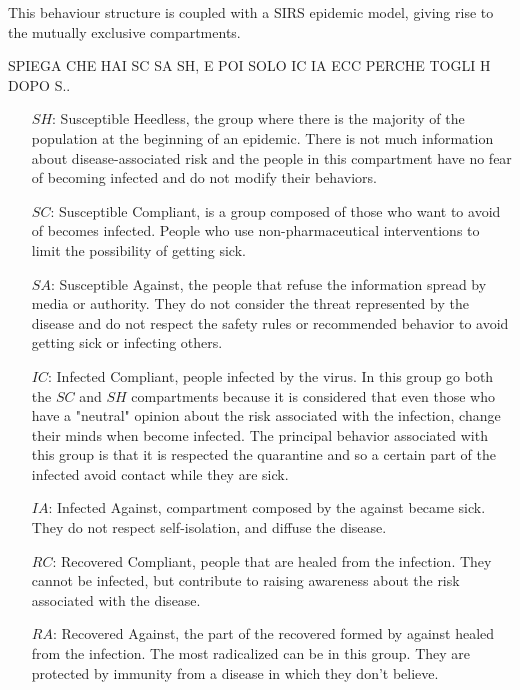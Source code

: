 This behaviour structure is coupled with a SIRS epidemic model, giving rise to the mutually exclusive compartments.

SPIEGA CHE HAI SC SA SH, E POI SOLO IC IA ECC
PERCHE TOGLI H DOPO S..

\begin{itemize}
	\item[$SH$:] Susceptible Heedless, the group where there is the majority of the population at the beginning of an epidemic. There is not much information about disease-associated risk and the people in this compartment have no fear of becoming infected and do not modify their behaviors.
	\item[$SC$:] Susceptible Compliant, is a group composed of those who want to avoid of becomes infected. People who use non-pharmaceutical interventions to limit the possibility of getting sick.
	\item[$SA$:] Susceptible Against, the people that refuse the information spread by media or authority. They do not consider the threat represented by the disease and do not respect the safety rules or recommended behavior to avoid getting sick or infecting others. 
	\item[$IC$:] Infected Compliant, people infected by the virus. In this group go both the $SC$ and $SH$ compartments because it is considered that even those who have a "neutral" opinion about the risk associated with the infection, change their minds when become infected. The principal behavior associated with this group is that it is respected the quarantine and so a certain part of the infected avoid contact while they are sick.
	\item[$IA$:] Infected Against, compartment composed by the against became sick. They do not respect self-isolation, and diffuse the disease. 
	\item[$RC$:] Recovered Compliant, people that are healed from the infection. They cannot be infected, but contribute to raising awareness about the risk associated with the disease. 
	\item[$RA$:] Recovered Against, the part of the recovered formed by against healed from the infection. The most radicalized can be in this group. They are protected by immunity from a disease in which they don't believe. 
\end{itemize}

